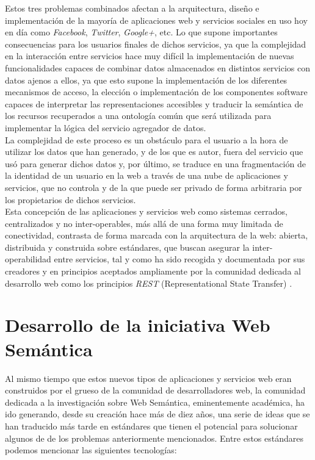 Estos tres problemas combinados afectan a la arquitectura, dise\~no e implementaci\'on de la mayor\'ia de aplicaciones web y servicios sociales en uso hoy en d\'ia como {\it Facebook}, {\it Twitter}, {\it Google+}, etc. Lo que supone importantes consecuencias para los usuarios finales de dichos servicios, ya que la complejidad en la interacci\'on entre servicios hace muy dif\'icil la implementaci\'on de nuevas funcionalidades capaces de combinar datos almacenados en distintos servicios con datos ajenos a ellos, ya que esto supone la implementaci\'on de los diferentes mecanismos de acceso, la elecci\'on o implementaci\'on de los componentes software capaces de interpretar las representaciones accesibles y traducir la sem\'antica de los recursos recuperados a una ontolog\'ia com\'un que ser\'a utilizada para implementar la l\'ogica del servicio agregador de datos.\\
La complejidad de este proceso es un obst\'aculo para el usuario a la hora de utilizar los datos que han generado, y de los que es autor, fuera del servicio que us\'o para generar dichos datos y, por \'ultimo, se traduce en una fragmentaci\'on de la identidad de un usuario en la web a trav\'es de una nube de aplicaciones y servicios, que no controla y de la que puede ser privado de forma arbitraria por los propietarios de dichos servicios.\\
Esta concepci\'on de las aplicaciones y servicios web como sistemas cerrados, centralizados y no inter-operables, m\'as all\'a de una forma muy limitada de conectividad, contrasta de forma marcada con la arquitectura de la web: abierta, distribuida y construida sobre est\'andares, que buscan asegurar la inter-operabilidad entre servicios, tal y como ha sido recogida y documentada por sus creadores \cite{berners1997axioms} y en principios aceptados ampliamente por la comunidad dedicada al desarrollo web como los principios {\it REST} (Representational State Transfer) \cite{fielding2000representational}.\\

\section{Desarrollo de la iniciativa Web Sem\'antica}
Al mismo tiempo que estos nuevos tipos de aplicaciones y servicios web eran construidos por el grueso de la comunidad de desarrolladores web, la comunidad dedicada a la investigaci\'on sobre Web Sem\'antica, eminentemente acad\'emica, ha ido generando, desde su creaci\'on hace m\'as de diez a\~nos, una serie de ideas que se han traducido m\'as tarde en est\'andares que tienen el potencial para solucionar algunos de de los problemas anteriormente mencionados. Entre estos est\'andares podemos mencionar las siguientes tecnolog\'ias:

